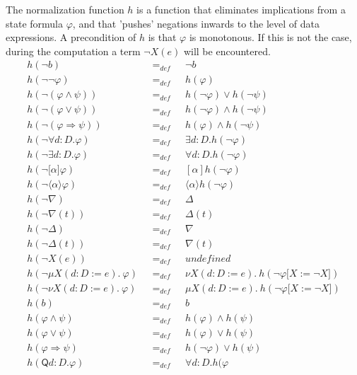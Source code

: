 \documentclass{article}
\begin{document}
The normalization function $h$ is a function that eliminates implications
from a state formula $\varphi $, and that 'pushes' negations inwards to the
level of data expressions. A precondition of $h$ is that $\varphi $ is
monotonous. If this is not the case, during the computation a term $\lnot
X(e)$ will be encountered.%
\begin{equation*}
\begin{array}{lll}
h(\lnot b) & =_{def} & \lnot b \\ 
h(\lnot \lnot \varphi ) & =_{def} & h(\varphi ) \\ 
h(\lnot (\varphi \wedge \psi )) & =_{def} & h(\lnot \varphi )\vee h(\lnot
\psi ) \\ 
h(\lnot (\varphi \vee \psi )) & =_{def} & h(\lnot \varphi )\wedge h(\lnot
\psi ) \\ 
h(\lnot (\varphi \Rightarrow \psi )) & =_{def} & h(\varphi )\wedge h(\lnot
\psi ) \\ 
h(\lnot \forall d{{:}D}.\varphi ) & =_{def} & \exists d{{:}D}.h(\lnot
\varphi ) \\ 
h(\lnot \exists d{{:}D}.\varphi ) & =_{def} & \forall d{{:}D}.h(\lnot
\varphi ) \\ 
h(\lnot \lbrack \alpha ]\varphi ) & =_{def} & [\alpha ]h(\lnot \varphi ) \\ 
h(\lnot \langle \alpha \rangle \varphi ) & =_{def} & \langle \alpha \rangle
h(\lnot \varphi ) \\ 
h(\lnot \nabla ) & =_{def} & \Delta \\ 
h(\lnot \nabla (t)) & =_{def} & \Delta (t) \\ 
h(\lnot \Delta ) & =_{def} & \nabla \\ 
h(\lnot \Delta (t)) & =_{def} & \nabla (t) \\ 
h(\lnot X(e)) & =_{def} & undefined \\ 
h(\lnot \mu X(d{:}D:=e).~\varphi )~~~ & =_{def}~~~ & \nu X(d{:}%
D:=e).~h(\lnot \varphi \lbrack X:=\lnot X]) \\ 
h(\lnot \nu X(d{:}D:=e).~\varphi )~~~ & =_{def}~~~ & \mu X(d{:}%
D:=e).~h(\lnot \varphi \lbrack X:=\lnot X]) \\ 
h(b) & =_{def} & b \\ 
h(\varphi \wedge \psi ) & =_{def} & h(\varphi )\wedge h(\psi ) \\ 
h(\varphi \vee \psi ) & =_{def} & h(\varphi )\vee h(\psi ) \\ 
h(\varphi \Rightarrow \psi ) & =_{def} & h(\lnot \varphi )\vee h(\psi ) \\ 
h(\mathsf{Q}d{{:}D}.\varphi ) & =_{def} & \mathsf{\forall }d{{:}D}.h(\varphi

\end{array}
\end{equation*}
\end{document}
